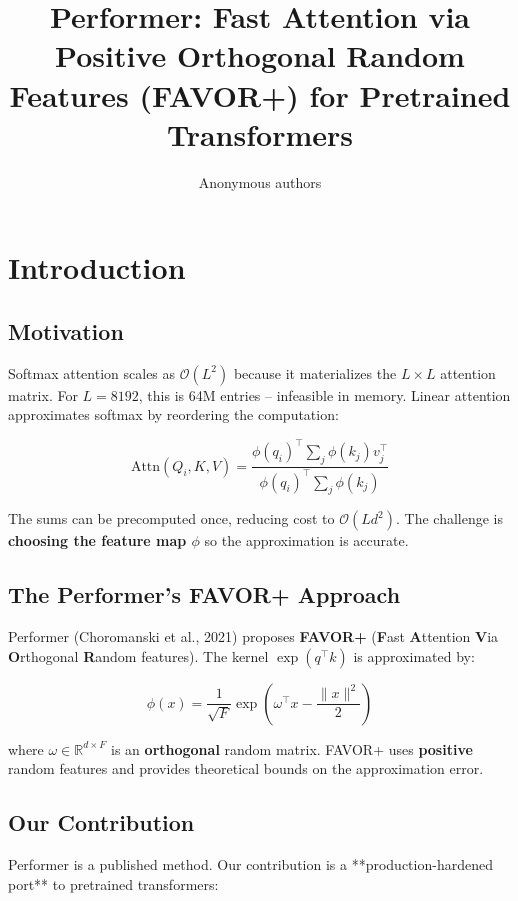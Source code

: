 \title{\textbf{Performer: Fast Attention via Positive Orthogonal Random Features (FAVOR+) for Pretrained Transformers}}

\author{Anonymous authors}



\section{Introduction}

\subsection{Motivation}

Softmax attention scales as $\mathcal{O}(L^2)$ because it materializes the 
$L \times L$ attention matrix. For $L = 8192$, this is 64M entries -- 
infeasible in memory. Linear attention approximates softmax by reordering 
the computation:

\[
\text{Attn}(Q_i, K, V) = \frac{\phi(q_i)^\top \sum_j \phi(k_j) v_j^\top}{\phi(q_i)^\top \sum_j \phi(k_j)}
\tag{1.1}
\]

The sums can be precomputed once, reducing cost to $\mathcal{O}(L d^2)$. The 
challenge is \textbf{choosing the feature map $\phi$} so the approximation is 
accurate.

\subsection{The Performer's FAVOR+ Approach}

Performer (Choromanski et al., 2021) proposes \textbf{FAVOR+} (\textbf{F}ast 
\textbf{A}ttention \textbf{V}ia \textbf{O}rthogonal \textbf{R}andom features). The kernel 
$\exp(q^\top k)$ is approximated by:

\[
\phi(x) = \frac{1}{\sqrt{F}} \exp\!\left(\omega^\top x - \frac{\|x\|^2}{2}\right)
\tag{1.2}
\]

where $\omega \in \mathbb{R}^{d \times F}$ is an \textbf{orthogonal} random 
matrix. FAVOR+ uses \textbf{positive} random features and provides theoretical 
bounds on the approximation error.

\subsection{Our Contribution}

Performer is a published method. Our contribution is a **production-hardened 
port** to pretrained transformers:

